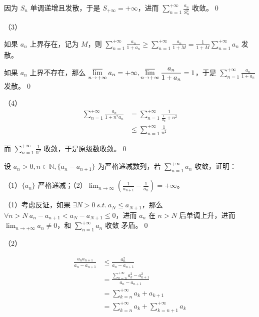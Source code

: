 因为 $\displaystyle S_{n}$ 单调递增且发散，于是 $\displaystyle S_{+\infty } =+\infty $，进而 $\displaystyle \sum _{n=1}^{+\infty }\frac{a_{n}}{S_{n}^{2}}$ 收敛。\qed 



（3）

如果 $\displaystyle a_{n}$ 上界存在，记为 $\displaystyle M$，则 $\displaystyle \sum _{n=1}^{+\infty }\frac{a_{n}}{1+a_{n}} \geqslant \sum _{n=1}^{+\infty }\frac{a_{n}}{1+M} =\frac{1}{1+M}\sum _{n=1}^{+\infty } a_{n}$ 发散。

如果 $\displaystyle a_{n}$ 上界不存在，那么 $\displaystyle \varlimsup _{n\rightarrow +\infty } a_{n} =+\infty ,\varlimsup _{n\rightarrow +\infty }\frac{a_{n}}{1+a_{n}} =1$，于是 $\displaystyle \sum _{n=1}^{+\infty }\frac{a_{n}}{1+a_{n}}$ 发散。\qed 



（4）
\begin{align*}
	\sum _{n=1}^{+\infty }\frac{a_{n}}{1+n^{2} a_{n}} & =\sum _{n=1}^{+\infty }\frac{1}{\frac{1}{a_{n}} +n^{2}}\\
	& \leqslant \sum _{n=1}^{+\infty }\frac{1}{n^{2}}
\end{align*}


而 $\displaystyle \sum _{n=1}^{+\infty }\frac{1}{n^{2}}$ 收敛，于是原级数收敛。\qed 



\begin{ques}
	设 $\displaystyle a_{n}  >0,n\in \mathbb{N} ,\{a_{n} -a_{n+1}\}$ 为严格递减数列，若 $\displaystyle \sum _{n=1}^{+\infty } a_{n}$ 收敛，证明：

（1）$\displaystyle \{a_{n}\}$ 严格递减；（2）$\displaystyle \lim _{n\rightarrow \infty }\left(\frac{1}{a_{n+1}} -\frac{1}{a_{n}}\right) =+\infty $。
\end{ques}



（1）考虑反证，如果 $\displaystyle \exists N >0\ s.t.\ a_{N} \leqslant a_{N+1}$，那么 $\displaystyle \forall n >N\ a_{n} -a_{n+1} < a_{N} -a_{N+1} \leqslant 0$，进而 $\displaystyle a_{n}$ 在 $\displaystyle n >N$ 后单调上升，进而 $\displaystyle \lim _{n\rightarrow +\infty } a_{n} \neq 0$，和 $\displaystyle \sum _{n=1}^{+\infty } a_{n}$ 收敛 矛盾。\qed 

（2）


\begin{align*}
	\frac{a_{n} a_{n+1}}{a_{n} -a_{n+1}} & \leqslant \frac{a_{n}^{2}}{a_{n} -a_{n+1}}\\
	& =\frac{\sum _{k=n}^{+\infty } a_{k}^{2} -a_{k+1}^{2}}{a_{n} -a_{n+1}}\\
	& =\sum _{k=n}^{+\infty } a_{k} +a_{k+1}\\
	& =\sum _{k=n}^{+\infty } a_{k} +\sum _{k=n+1}^{+\infty } a_{k}
\end{align*}


